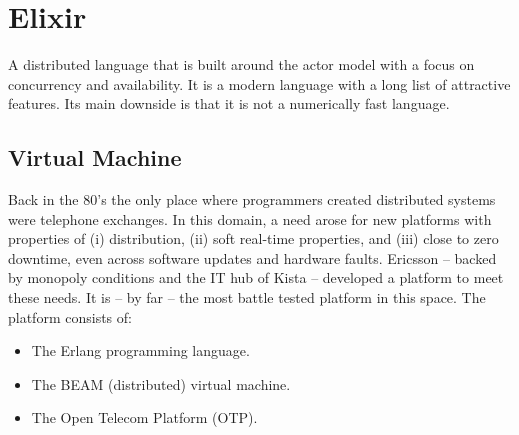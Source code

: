 {
\setmonofont[
  Contextuals={Alternate}
]{Fira Code}

\section{Elixir}

A distributed language that is built around the actor model with a focus on concurrency and availability. It is a modern language with a long list of attractive features. Its main downside is that it is not a numerically fast language.

\subsection{Virtual Machine}

Back in the 80's the only place where programmers created distributed systems were telephone exchanges. In this domain, a need arose for new platforms with properties of (i) distribution, (ii) soft real-time properties, and (iii) close to zero downtime, even across software updates and hardware faults. Ericsson -- backed by monopoly conditions and the IT hub of Kista -- developed a platform to meet these needs. It is -- by far -- the most battle tested platform in this space. The platform consists of:
\begin{itemize}
  \item The Erlang programming language.
  \item The BEAM (distributed) virtual machine.
  \item The Open Telecom Platform (OTP).
\end{itemize}

}
